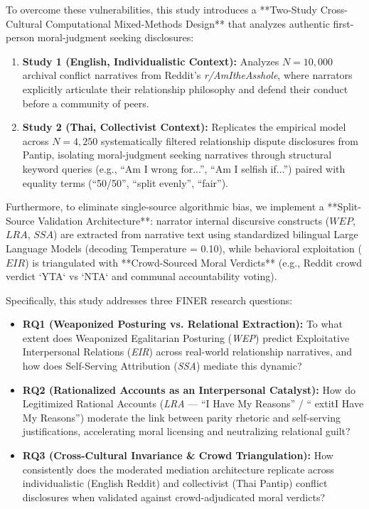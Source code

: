 To overcome these vulnerabilities, this study introduces a **Two-Study Cross-Cultural Computational Mixed-Methods Design** that analyzes authentic first-person moral-judgment seeking disclosures:
\begin{enumerate}[leftmargin=*]
    \item \textbf{Study 1 (English, Individualistic Context):} Analyzes $N = 10,000$ archival conflict narratives from Reddit's \textit{r/AmItheAsshole}, where narrators explicitly articulate their relationship philosophy and defend their conduct before a community of peers.
    \item \textbf{Study 2 (Thai, Collectivist Context):} Replicates the empirical model across $N = 4,250$ systematically filtered relationship dispute disclosures from Pantip, isolating moral-judgment seeking narratives through structural keyword queries (e.g., ``Am I wrong for...'', ``Am I selfish if...'') paired with equality terms (``50/50'', ``split evenly'', ``fair'').
\end{enumerate}

Furthermore, to eliminate single-source algorithmic bias, we implement a **Split-Source Validation Architecture**: narrator internal discursive constructs ($WEP$, $LRA$, $SSA$) are extracted from narrative text using standardized bilingual Large Language Models (decoding Temperature = 0.10), while behavioral exploitation ($EIR$) is triangulated with **Crowd-Sourced Moral Verdicts** (e.g., Reddit crowd verdict `YTA` vs `NTA` and communal accountability voting).

Specifically, this study addresses three FINER research questions:
\begin{itemize}[leftmargin=*]
    \item \textbf{RQ1 (Weaponized Posturing vs. Relational Extraction):} To what extent does Weaponized Egalitarian Posturing (\textit{WEP}) predict Exploitative Interpersonal Relations (\textit{EIR}) across real-world relationship narratives, and how does Self-Serving Attribution (\textit{SSA}) mediate this dynamic?
    \item \textbf{RQ2 (Rationalized Accounts as an Interpersonal Catalyst):} How do Legitimized Rational Accounts (\textit{LRA} — ``I Have My Reasons'' / ``	extit{I Have My Reasons''}) moderate the link between parity rhetoric and self-serving justifications, accelerating moral licensing and neutralizing relational guilt?
    \item \textbf{RQ3 (Cross-Cultural Invariance \& Crowd Triangulation):} How consistently does the moderated mediation architecture replicate across individualistic (English Reddit) and collectivist (Thai Pantip) conflict disclosures when validated against crowd-adjudicated moral verdicts?
\end{itemize}

